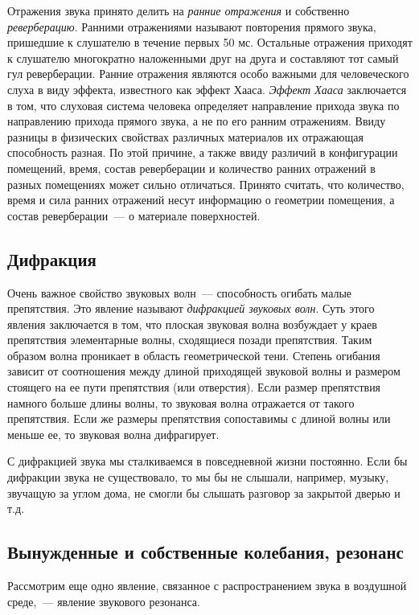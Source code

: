 \documentclass[oneside, final, 14pt]{extreport}
\begin{document}
Отражения звука принято делить на {\itshape ранние отражения} и собственно {\itshape реверберацию}. Ранними отражениями называют повторения прямого звука, пришедшие к слушателю в течение первых 50 мс. Остальные отражения приходят к слушателю многократно наложенными друг на друга и составляют тот самый гул реверберации. Ранние отражения являются особо важными для человеческого слуха в виду эффекта, известного как эффект Хааса. {\itshape Эффект Хааса} заключается в том, что слуховая система человека определяет направление прихода звука по направлению прихода прямого звука, а не по его ранним отражениям. Ввиду разницы в физических свойствах различных материалов их отражающая способность разная. По этой причине, а также ввиду различий в конфигурации помещений, время, состав реверберации и количество ранних отражений в разных помещениях может сильно отличаться. Принято считать, что количество, время и сила ранних отражений несут информацию о геометрии помещения, а состав реверберации~--- о материале поверхностей.

\subsection{Дифракция}
Очень важное свойство звуковых волн~--- способность огибать малые препятствия. Это явление называют {\itshape дифракцией звуковых волн}. Суть этого явления заключается в том, что плоская звуковая волна возбуждает у краев препятствия элементарные волны, сходящиеся позади препятствия. Таким образом волна проникает в область геометрической тени. Степень огибания зависит от соотношения между длиной приходящей звуковой волны и размером стоящего на ее пути препятствия (или отверстия). Если размер препятствия намного больше длины волны, то звуковая волна отражается от такого препятствия. Если же размеры препятствия сопоставимы с длиной волны или меньше ее, то звуковая волна дифрагирует.

С дифракцией звука мы сталкиваемся в повседневной жизни постоянно. Если бы дифракции звука не существовало, то мы бы не слышали, например, музыку, звучащую за углом дома, не смогли бы слышать разговор за закрытой дверью и т.д.

\subsection{Вынужденные и собственные колебания, резонанс}
Рассмотрим еще одно явление, связанное с распространением звука в воздушной среде,~--- явление звукового резонанса.
\end{document}
